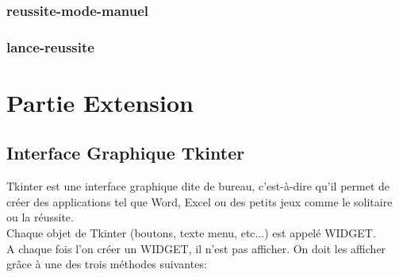 \documentclass[french, titlepage]{article}
\begin{document}
        \subsubsection{\ttfamily reussite-mode-manuel}
        \subsubsection{\ttfamily lance-reussite}


\section{Partie Extension}    
    
    \subsection{Interface Graphique Tkinter}
    
        Tkinter est une interface graphique dite de bureau, c'est-à-dire qu'il permet de créer des applications tel que Word, Excel ou des petits jeux comme le solitaire ou la réussite.\\
    
    Chaque objet de Tkinter (boutons, texte menu, etc...) est appelé WIDGET.\\
    A chaque fois l'on créer un WIDGET, il n'est pas afficher. On doit les afficher grâce à une des trois méthodes suivantes:\\
    
\end{document}
